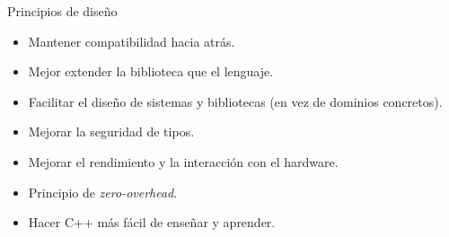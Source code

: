 
\begin{frame}[t]{Principios de diseño}
\begin{itemize}
  \item \pause  Mantener compatibilidad hacia atrás.
  \item \pause  Mejor extender la biblioteca que el lenguaje.
  \item \pause  Facilitar el diseño de sistemas y bibliotecas (en vez de dominios concretos).
  \item \pause  Mejorar la seguridad de tipos.
  \item \pause  Mejorar el rendimiento y la interacción con el hardware.
  \item \pause  Principio de \emph{zero-overhead}.
  \item \pause  Hacer C++ más fácil de enseñar y aprender.
\end{itemize}
\end{frame}

